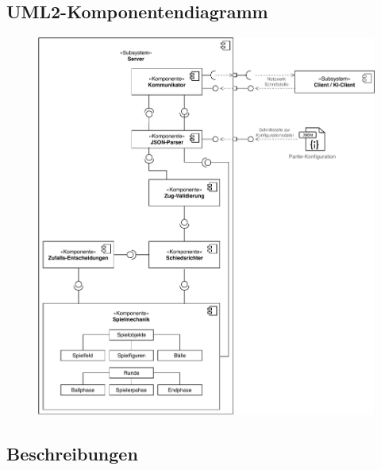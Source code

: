 \subsection{UML2-Komponentendiagramm}

    \begin{figure}[H]
        \centering
        \includegraphics[scale=0.75]{images/Server-Architektur_DrawIO-Gesammt.pdf}
    \end{figure}

\subsection{Beschreibungen}

